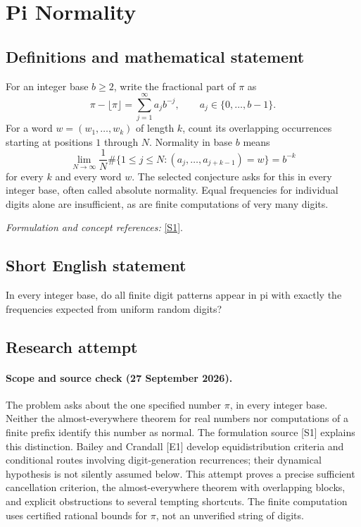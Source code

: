 \documentclass[11pt]{article}
\begin{document}
\section*{\texorpdfstring{Pi Normality}{Pi Normality}}\label{statement}
\subsection{Definitions and mathematical statement}
For an integer base $b\ge2$, write the fractional part of $\pi$ as
\[
 \pi-\lfloor\pi\rfloor=\sum_{j=1}^{\infty}a_jb^{-j},
 \qquad a_j\in\{0,\ldots,b-1\}.
\]
For a word $w=(w_1,\ldots,w_k)$ of length $k$, count its overlapping occurrences starting at positions $1$ through $N$. Normality in base $b$ means
\[
 \lim_{N\to\infty}\frac1N
 \#\{1\le j\le N:(a_j,\ldots,a_{j+k-1})=w\}=b^{-k}
\]
for every $k$ and every word $w$. The selected conjecture asks for this in every integer base, often called absolute normality. Equal frequencies for individual digits alone are insufficient, as are finite computations of very many digits.
\par\smallskip\textit{Formulation and concept references:} \href{https://www.claymath.org/library/annual_report/ar2006/06report_normalnumbers.pdf}{[S1]}.

\subsection{Short English statement}
In every integer base, do all finite digit patterns appear in pi with exactly the frequencies expected from uniform random digits?
\subsection{Research attempt}
\paragraph{Scope and source check (27 September 2026).}
The problem asks about the one specified number $\pi$, in every integer base. Neither the almost-everywhere theorem for real numbers nor computations of a finite prefix identify this number as normal. The formulation source [S1] explains this distinction. Bailey and Crandall [E1] develop equidistribution criteria and conditional routes involving digit-generation recurrences; their dynamical hypothesis is not silently assumed below. This attempt proves a precise sufficient cancellation criterion, the almost-everywhere theorem with overlapping blocks, and explicit obstructions to several tempting shortcuts. The finite computation uses certified rational bounds for $\pi$, not an unverified string of digits.
\end{document}
